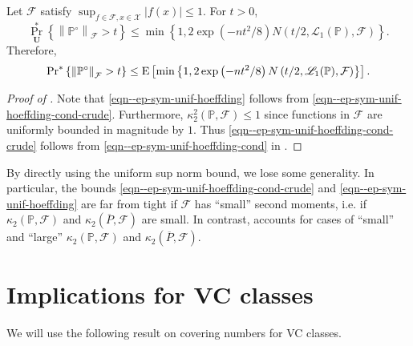 \begin{lemma}
\label{lem--ep-sym-unif-hoeffding}
Let \(\mathcal{F}\) satisfy \(\sup_{f \in \mathcal{F}, x \in \mathcal{X}} |f
(x)| \leq 1\).
For \(t > 0\),
\begin{equation}
  \Pr_{\mathbf{U}}^{\ast} \left\{ \left\| \mathbb{P}^{\circ}
  \right\|_{\mathcal{F}} > t \right\} \leq \min \left\{ 1, 2 \exp \left( - n
  t^{2} / 8 \right) N \left( t / 2, \mathscr{L}_{1} (\mathbb{P}), \mathcal{F}
  \right) \right\}.
  \label{eqn--ep-sym-unif-hoeffding-cond-crude}
\end{equation}
Therefore,
\begin{equation}
  \mathrm{Pr}^{\ast} \left\{ \left\| \mathbb{P}^{\circ} \right\|_{\mathcal{F}} > t
  \right\} \leq \mathrm{E} \left[ \min \left\{ 1, 2 \exp \left( - n t^{2} / 8 \right) N
  \left( t / 2, \mathscr{L}_{1} (\mathbb{P}), \mathcal{F} \right) \right\}
  \right].
  \label{eqn--ep-sym-unif-hoeffding}
\end{equation}
\end{lemma}

\begin{proof}[Proof of ]
Note that \eqref{eqn--ep-sym-unif-hoeffding} follows from
\eqref{eqn--ep-sym-unif-hoeffding-cond-crude}.
Furthermore, \(\kappa_{2}^{2} (\mathbb{P}, \mathcal{F}) \leq 1\) since functions
in \(\mathcal{F}\) are uniformly bounded in magnitude by \(1\).
Thus \eqref{eqn--ep-sym-unif-hoeffding-cond-crude} follows from
\eqref{eqn--ep-sym-unif-hoeffding-cond} in
.
\end{proof}

By directly using the uniform sup norm bound, we lose some generality.
In particular, the bounds \eqref{eqn--ep-sym-unif-hoeffding-cond-crude} and
\eqref{eqn--ep-sym-unif-hoeffding} are far from tight if \(\mathcal{F}\) has
``small'' second moments, i.e. if \(\kappa_{2} (\mathbb{P}, \mathcal{F})\) and
\(\kappa_{2} (\overline{P}, \mathcal{F})\) are small.
In contrast,  accounts for cases of ``small''
and ``large'' \(\kappa_{2} \left( \mathbb{P}, \mathcal{F} \right)\) and
\(\kappa_{2} \left( \overline{P}, \mathcal{F} \right)\).

\section{Implications for VC classes}

We will use the following result on covering numbers for VC classes.


